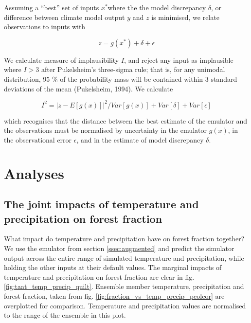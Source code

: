 \documentclass[gmd, manuscript]{copernicus}
\begin{document}
Assuming a ``best'' set of inputs $x^*$where the the model discrepancy $\delta$, or difference between climate model output $y$ and $z$ is minimised, we relate observations to inputs with 

\begin{equation}
z = g(x^*) + \delta + \epsilon 
\end{equation}

We calculate measure of implausibility $I$, and reject any input as implausible where $I >3$ after Pukelsheim's three-sigma rule; that is, for any unimodal distribution, 95 \% of the probability mass will be contained within 3 standard deviations of the mean (Pukelsheim, 1994). We calculate

\begin{equation}
I^{2} = {\lvert  z - E[g(x)]\rvert}^{2} /  Var[g(x)] + Var[\delta] +  Var[\epsilon]
\end{equation}

which recognises that the distance between the best estimate of the emulator and the observations must be normalised by uncertainty in the emulator $g(x)$, in the observational error $\epsilon$, and in the estimate of model discrepancy $\delta$. 


\section{Analyses}\label{sec:analyses}

\subsection{The joint impacts of temperature and precipitation on forest fraction}\label{ssec:joint}
What impact do temperature and precipitation have on forest fraction together? We use the emulator from section \ref{ssec:augmented} and predict the simulator output across the entire range of simulated temperature and precipitation, while holding the other inputs at their default values. The marginal impacts of temperature and precipitation on forest fraction are clear in fig. \ref{fig:taat_temp_precip_quilt}. Ensemble member temperature, precipitation and forest fraction, taken from fig. \ref{fig:fraction_vs_temp_precip_pcolcor} are overplotted for comparison. Temperature and precipitation values are normalised to the range of the ensemble in this plot.
\end{document}
